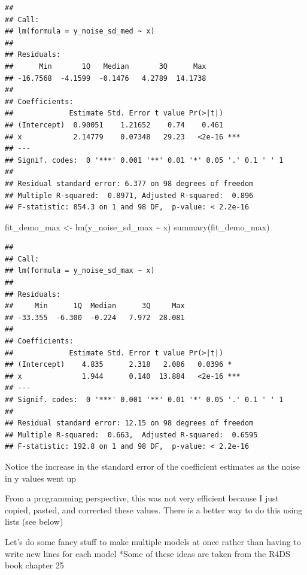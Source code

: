 \documentclass[
]{book}
\newenvironment{Shaded}{\begin{snugshade}}{\end{snugshade}}
\newcommand{\FunctionTok}[1]{\textcolor[rgb]{0.00,0.00,0.00}{#1}}
\newcommand{\NormalTok}[1]{#1}
\newcommand{\OtherTok}[1]{\textcolor[rgb]{0.56,0.35,0.01}{#1}}
\newcommand{\SpecialCharTok}[1]{\textcolor[rgb]{0.00,0.00,0.00}{#1}}
\begin{document}
\begin{verbatim}
## 
## Call:
## lm(formula = y_noise_sd_med ~ x)
## 
## Residuals:
##      Min       1Q   Median       3Q      Max 
## -16.7568  -4.1599  -0.1476   4.2789  14.1738 
## 
## Coefficients:
##             Estimate Std. Error t value Pr(>|t|)    
## (Intercept)  0.90051    1.21652    0.74    0.461    
## x            2.14779    0.07348   29.23   <2e-16 ***
## ---
## Signif. codes:  0 '***' 0.001 '**' 0.01 '*' 0.05 '.' 0.1 ' ' 1
## 
## Residual standard error: 6.377 on 98 degrees of freedom
## Multiple R-squared:  0.8971, Adjusted R-squared:  0.896 
## F-statistic: 854.3 on 1 and 98 DF,  p-value: < 2.2e-16
\end{verbatim}

\begin{Shaded}
\begin{Highlighting}[]
\NormalTok{fit\_demo\_max }\OtherTok{\textless{}{-}} \FunctionTok{lm}\NormalTok{(y\_noise\_sd\_max }\SpecialCharTok{\textasciitilde{}}\NormalTok{ x)}
\FunctionTok{summary}\NormalTok{(fit\_demo\_max)}
\end{Highlighting}
\end{Shaded}

\begin{verbatim}
## 
## Call:
## lm(formula = y_noise_sd_max ~ x)
## 
## Residuals:
##     Min      1Q  Median      3Q     Max 
## -33.355  -6.300  -0.224   7.972  28.081 
## 
## Coefficients:
##             Estimate Std. Error t value Pr(>|t|)    
## (Intercept)    4.835      2.318   2.086   0.0396 *  
## x              1.944      0.140  13.884   <2e-16 ***
## ---
## Signif. codes:  0 '***' 0.001 '**' 0.01 '*' 0.05 '.' 0.1 ' ' 1
## 
## Residual standard error: 12.15 on 98 degrees of freedom
## Multiple R-squared:  0.663,  Adjusted R-squared:  0.6595 
## F-statistic: 192.8 on 1 and 98 DF,  p-value: < 2.2e-16
\end{verbatim}

Notice the increase in the standard error of the coefficient estimates as the noise in y values went up

From a programming perspective, this was not very efficient because I just copied, pasted, and corrected these values.
There is a better way to do this using lists (see below)

Let's do some fancy stuff to make multiple models at once rather than having to write new lines for each model
*Some of these ideas are taken from the R4DS book chapter 25
\end{document}
